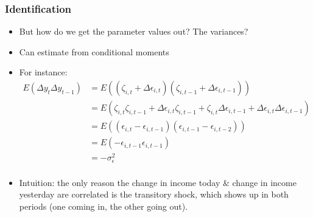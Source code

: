\documentclass{beamer}
\begin{document}
\begin{frame}
\frametitle[alignment=center]{Identification}
\begin{itemize}
\item But how do we get the parameter values out?  The variances?  
\bigskip
\item Can estimate from conditional moments
\bigskip
\item For instance:
\small
\begin{align*}
E(\Delta y_{t}\Delta y_{t-1}) & = E((\zeta_{i,t}+\Delta \epsilon_{i,t})(\zeta_{i,t-1}+\Delta \epsilon_{i,t-1}))\\
& = E(\zeta_{i,t}\zeta_{i,t-1}+\Delta \epsilon_{i,t}\zeta_{i,t-1}+\zeta_{i,t}\Delta \epsilon_{i,t-1}+\Delta \epsilon_{i,t}\Delta \epsilon_{i,t-1})\\
& = E((\epsilon_{i,t}-\epsilon_{i,t-1})(\epsilon_{i,t-1}-\epsilon_{i,t-2}))\\
& = E(-\epsilon_{i,t-1}\epsilon_{i,t-1})\\
& = -\sigma^2_\epsilon\\
\end{align*}
\item Intuition:  the only reason the change in income today \& change in income yesterday are correlated is the transitory shock, which shows up in both periods (one coming in, the other going out).
\end{itemize}
\end{frame}
\end{document}
